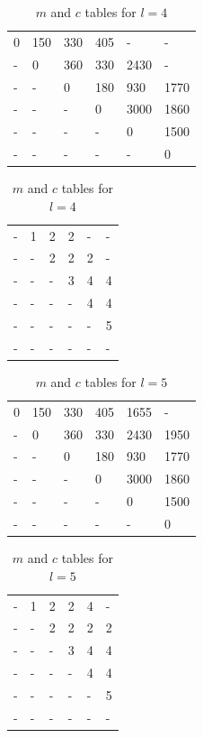 \documentclass[11pt]{article}
\begin{document}
\begin{sol}
\begin{table}[htbp]
	\centering
	\begin{tabular}{|l|l|l|l|l|l|}
		 \hline
        0 & 150 & 330 & 405 & - & - \\ 
        - & 0 & 360 &330 & 2430 & - \\ 
        - & - & 0 & 180 & 930 & 1770 \\ 
        - & - & - & 0 & 3000 & 1860\\ 
        - & - & - & - & 0 & 1500  \\ 
        - & - & - & - & - & 0 \\
        \hline
	\end{tabular}
	\hspace{20mm}
	\begin{tabular}{|l|l|l|l|l|l|}
		 \hline
        - & 1 & 2 & 2 & - & - \\ 
        - & - & 2 & 2 & 2 & - \\ 
        - & - & - & 3 & 4 & 4 \\ 
        - & - & - & - & 4 & 4 \\ 
        - & - & - & - & - & 5 \\ 
        - & - & - & - & - & - \\
        \hline
	\end{tabular}
	\caption{$m$ and $c$ tables for $l = 4$}
\end{table}

\begin{table}[htbp]
	\centering
	\begin{tabular}{|l|l|l|l|l|l|}
		 \hline
        0 & 150 & 330 & 405 & 1655 & - \\ 
        - & 0 & 360 &330 & 2430 & 1950 \\ 
        - & - & 0 & 180 & 930 & 1770 \\ 
        - & - & - & 0 & 3000 & 1860\\ 
        - & - & - & - & 0 & 1500  \\ 
        - & - & - & - & - & 0 \\
        \hline
	\end{tabular}
	\hspace{20mm}
	\begin{tabular}{|l|l|l|l|l|l|}
		 \hline
        - & 1 & 2 & 2 & 4 & - \\ 
        - & - & 2 & 2 & 2 & 2 \\ 
        - & - & - & 3 & 4 & 4 \\ 
        - & - & - & - & 4 & 4 \\ 
        - & - & - & - & - & 5 \\ 
        - & - & - & - & - & - \\
        \hline
	\end{tabular}
	\caption{$m$ and $c$ tables for $l = 5$}
\end{table}


\end{sol}
\end{document}
